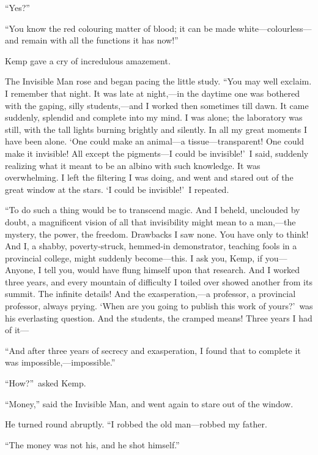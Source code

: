 “Yes?”

“You know the red colouring matter of blood; it can be made white—colourless—and remain with all the functions it has now!”

Kemp gave a cry of incredulous amazement.

The Invisible Man rose and began pacing the little study. “You may well exclaim. I remember that night. It was late at night,—in the daytime one was bothered with the gaping, silly students,—and I worked then sometimes till dawn. It came suddenly, splendid and complete into my mind. I was alone; the laboratory was still, with the tall lights burning brightly and silently. In all my great moments I have been alone. ‘One could make an animal—a tissue—transparent! One could make it invisible! All except the pigments—I could be invisible!’\ I said, suddenly realizing what it meant to be an albino with such knowledge. It was overwhelming. I left the filtering I was doing, and went and stared out of the great window at the stars. ‘I could be invisible!’\ I repeated.

“To do such a thing would be to transcend magic. And I beheld, unclouded by doubt, a magnificent vision of all that invisibility might mean to a man,—the mystery, the power, the freedom. Drawbacks I saw none. You have only to think! And I, a shabby, poverty-struck, hemmed-in demonstrator, teaching fools in a provincial college, might suddenly become—this. I ask you, Kemp, if you— Anyone, I tell you, would have flung himself upon that research. And I worked three years, and every mountain of difficulty I toiled over showed another from its summit. The infinite details! And the exasperation,—a professor, a provincial professor, always prying. ‘When are you going to publish this work of yours?’\ was his everlasting question. And the students, the cramped means! Three years I had of it—

“And after three years of secrecy and exasperation, I found that to complete it was impossible,—impossible.”

“How?”\ asked Kemp.

“Money,” said the Invisible Man, and went again to stare out of the window.

He turned round abruptly. “I robbed the old man—robbed my father.

“The money was not his, and he shot himself.”